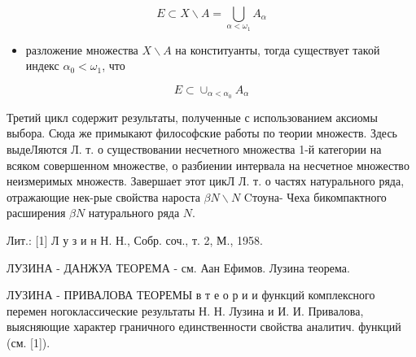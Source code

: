 \documentclass[10pt]{article}
\begin{document}
\[

E \subset X \backslash A=\bigcup_{\alpha<\omega_{1}} A_{\alpha}

\]



\begin{itemize}

  \item разложение множества $X \backslash A$ на конституанты, тогда существует такой индекс $\alpha_{0}<\omega_{1}$, что

\end{itemize}



\[

E \subset \cup_{\alpha<\alpha_{0}} A_{\alpha}

\]



Третий цикл содержит результаты, полученные с использованием аксиомы выбора. Сюда же примыкают философские работы по теории множеств. Здесь выдеЛяются Л. т. о существовании несчетного множества 1-й категории на всяком совершенном множестве, о разбиении интервала на несчетное множество неизмеримых множеств. Завершает этот цикЛ Л. т. о частях натурального ряда, отражающие нек-рые свойства нароста $\beta N \backslash N$ Cтоуна- Чеха бикомпактного расширения $\beta N$ натурального ряда $N$.



Лит.: [1] Л у з и н Н. Н., Собр. соч., т. 2, М., 1958.



ЛУЗИНА - ДАНЖУА ТЕОРЕМА - см. Аан Ефимов. Лузина теорема.



ЛУЗИНА - ПРИВАЛОВА ТЕОРЕМЫ в т е о р и и функций комплексного перемен ногоклассические результаты Н. Н. Лузина и И. И. Привалова, выясняющие характер граничного единственности свойства аналитич. функций (см. [1]).
\end{document}
